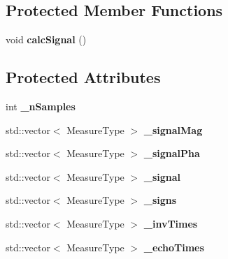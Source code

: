 \subsection*{Protected Member Functions}
\begin{DoxyCompactItemize}
\item 
\hypertarget{class_ox_1_1_test_data_a014e56191a98df90450c0b6fa2abc45d}{void {\bfseries calc\-Signal} ()}\label{class_ox_1_1_test_data_a014e56191a98df90450c0b6fa2abc45d}

\end{DoxyCompactItemize}
\subsection*{Protected Attributes}
\begin{DoxyCompactItemize}
\item 
\hypertarget{class_ox_1_1_test_data_a41f65fef5fa534f713cb8a229e5ae14d}{int {\bfseries \-\_\-n\-Samples}}\label{class_ox_1_1_test_data_a41f65fef5fa534f713cb8a229e5ae14d}

\item 
\hypertarget{class_ox_1_1_test_data_a180e0158dc204212fd4879690b2ea3ad}{std\-::vector$<$ Measure\-Type $>$ {\bfseries \-\_\-signal\-Mag}}\label{class_ox_1_1_test_data_a180e0158dc204212fd4879690b2ea3ad}

\item 
\hypertarget{class_ox_1_1_test_data_a5012bab7b7943d05b33151aae38efcc1}{std\-::vector$<$ Measure\-Type $>$ {\bfseries \-\_\-signal\-Pha}}\label{class_ox_1_1_test_data_a5012bab7b7943d05b33151aae38efcc1}

\item 
\hypertarget{class_ox_1_1_test_data_a3d844b169fbdbfcb77d5ef0bf527f554}{std\-::vector$<$ Measure\-Type $>$ {\bfseries \-\_\-signal}}\label{class_ox_1_1_test_data_a3d844b169fbdbfcb77d5ef0bf527f554}

\item 
\hypertarget{class_ox_1_1_test_data_a9e22c4f291064b0c49f7c8007e77b40a}{std\-::vector$<$ Measure\-Type $>$ {\bfseries \-\_\-signs}}\label{class_ox_1_1_test_data_a9e22c4f291064b0c49f7c8007e77b40a}

\item 
\hypertarget{class_ox_1_1_test_data_a4a72325aa7d38c4cac1762a47b7eed1a}{std\-::vector$<$ Measure\-Type $>$ {\bfseries \-\_\-inv\-Times}}\label{class_ox_1_1_test_data_a4a72325aa7d38c4cac1762a47b7eed1a}

\item 
\hypertarget{class_ox_1_1_test_data_aaffd834afe5a5ceb48eb84a9268d0d68}{std\-::vector$<$ Measure\-Type $>$ {\bfseries \-\_\-echo\-Times}}\label{class_ox_1_1_test_data_aaffd834afe5a5ceb48eb84a9268d0d68}


\end{DoxyCompactItemize}
